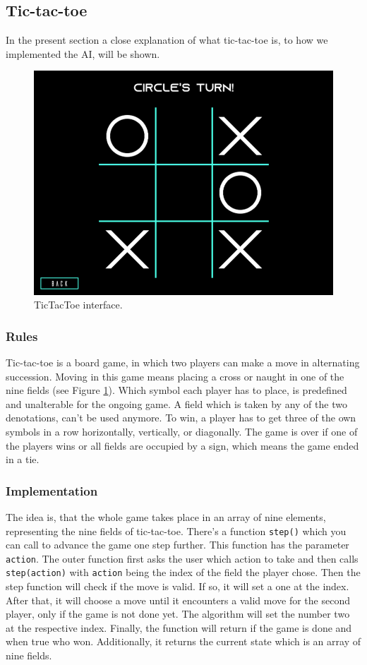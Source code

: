 \documentclass[12pt]{article}
\begin{document}
\subsection{Tic-tac-toe}
In the present section a close explanation of what tic-tac-toe is, to how we implemented the AI, will be shown.
\begin{figure}[ht]
    \centering
    \includegraphics[width=0.9\linewidth]{pictures/TicTacToe.png}
    \caption{TicTacToe interface.}
    \label{fig:tictactoe}
\end{figure}
\subsubsection{Rules}
Tic-tac-toe is a board game, in which two players can make a move in alternating succession. Moving in this game means placing a cross or naught in one of the nine fields (see Figure \ref{fig:tictactoe}). Which symbol each player has to place, is predefined and unalterable for the ongoing game. A field which is taken by any of the two denotations, can't be used anymore. To win, a player has to get three of the own symbols in a row horizontally, vertically, or diagonally. The game is over if one of the players wins or all fields are occupied by a sign, which means the game ended in a tie.
\subsubsection{Implementation}\label{sssec:impl}
The idea is, that the whole game takes place in an array of nine elements, representing the nine fields of tic-tac-toe. There's a function \lstinline{step()} which you can call to advance the game one step further. This function has the parameter \lstinline{action}. The outer function first asks the user which action to take and then calls \lstinline{step(action)} with \lstinline{action} being the index of the field the player chose. Then the step function will check if the move is valid. If so, it will set a one at the index. After that, it will choose a move until it encounters a valid move for the second player, only if the game is not done yet. The algorithm will set the number two at the respective index. Finally, the function will return if the game is done and when true who won. Additionally, it returns the current \gls{state} which is an array of nine fields.
\end{document}
